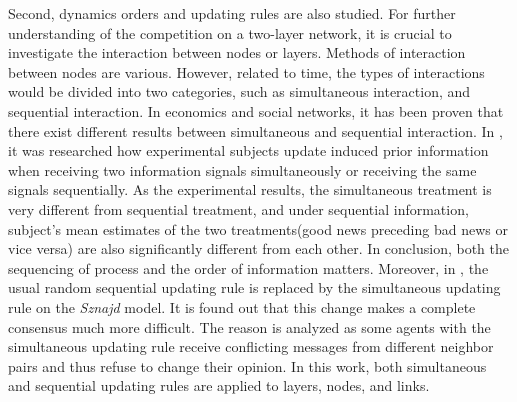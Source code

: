 Second, dynamics orders and updating rules are also studied. For further understanding of the competition on a two-layer network, it is crucial to investigate the interaction between nodes or layers. Methods of interaction between nodes are various.\parencite{sirbu2017} However, related to time, the types of interactions would be divided into two categories, such as simultaneous interaction, and sequential interaction. In economics and social networks, it has been proven that there exist different results between simultaneous and sequential interaction.\parencite{hoffman2011, dietrich2004} In \parencite{hoffman2011}, it was researched how experimental subjects update induced prior information when receiving two information signals simultaneously or receiving the same signals sequentially. As the experimental results, the simultaneous treatment is very different from sequential treatment, and under sequential information,  subject’s mean estimates of the two treatments(good news preceding bad news or vice versa) are also significantly different from each other. In conclusion, both the sequencing of process and the order of information matters. Moreover, in \parencite{dietrich2004}, the usual random sequential updating rule is replaced by the simultaneous updating rule on the \textit{Sznajd} model. It is found out that this change makes a complete consensus much more difficult. The reason is analyzed as some agents with the simultaneous updating rule receive conflicting messages from different neighbor pairs and thus refuse to change their opinion. In this work, both simultaneous and sequential updating rules are applied to layers, nodes, and links.

